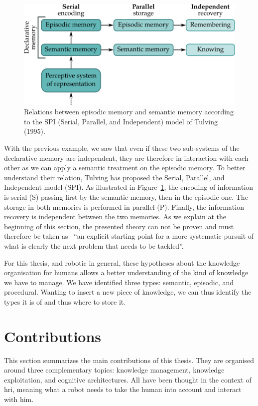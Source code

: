 \begin{figure}[h!]
\centering
\includegraphics[scale=0.45]{figures/introduction/SPI.png}
\caption{\label{fig:SPI} Relations between episodic memory and semantic memory according to the SPI (Serial, Parallel, and Independent) model of Tulving (1995).}
\end{figure}

With the previous example, we saw that even if these two sub-systems of the declarative memory are independent, they are therefore in interaction with each other as we can apply a semantic treatment on the episodic memory. To better understand their relation, Tulving has proposed the Serial, Parallel, and Independent model (SPI). As illustrated in Figure~\ref{fig:SPI}, the encoding of information is serial (S) passing first by the semantic memory, then in the episodic one. The storage in both memories is performed in parallel (P). Finally, the information recovery is independent between the two memories.
As we explain at the beginning of this section, the presented theory can not be proven and must therefore be taken as~\cite{tulving_1995_organization} ``an explicit starting point for a more systematic pursuit of what is clearly the next problem that needs to be tackled''.

For this thesis, and robotic in general, these hypotheses about the knowledge organisation for humans allows a better understanding of the kind of knowledge we have to manage. We have identified three types: semantic, episodic, and procedural. Wanting to insert a new piece of knowledge, we can thus identify the types it is of and thus where to store it.

\section{Contributions}

This section summarizes the main contributions of this thesis. They are organised around three complementary topics: knowledge management, knowledge exploitation, and cognitive architectures. All have been thought in the context of \acrlong{hri}, meaning what a robot needs to take the human into account and interact with him.

